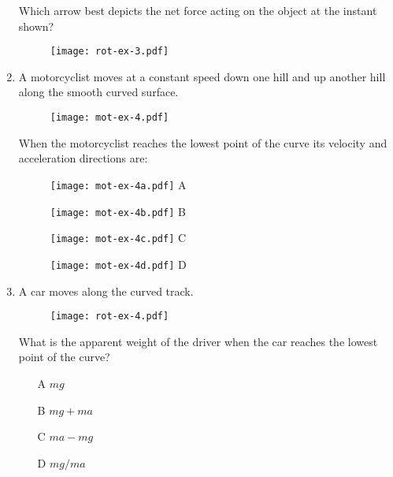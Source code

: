 \begin{enumerate}
Which arrow best depicts the net force acting on the object at the instant shown?

\begin{figure}[H]
\centering
\texttt{[image: rot-ex-3.pdf]}
\end{figure}


\item A motorcyclist moves at a constant speed down one hill and up another hill along the smooth curved surface. 

\begin{figure}[H]
\centering
\texttt{[image: mot-ex-4.pdf]}
\end{figure}

When the motorcyclist reaches the lowest point of the curve its velocity and acceleration directions are:



\begin{figure}[H]

\centering

\begin{minipage}{.1\textwidth}
  \centering
  \texttt{[image: mot-ex-4a.pdf]}
  A
\end{minipage}
\hspace{1cm}
\begin{minipage}{.1\textwidth}
  \centering
  \texttt{[image: mot-ex-4b.pdf]}
  B
\end{minipage}
\hspace{1cm}
\begin{minipage}{.1\textwidth}
  \centering
  \texttt{[image: mot-ex-4c.pdf]}
  C
\end{minipage}
\hspace{1cm}
\begin{minipage}{.1\textwidth}
  \centering
  \texttt{[image: mot-ex-4d.pdf]}
  D
\end{minipage}
\end{figure}

\item A car moves along the curved track. 

\begin{figure}[H]
\centering
\texttt{[image: rot-ex-4.pdf]}
\end{figure}

What is the apparent weight of the driver when the car reaches the lowest point of the curve?

\begin{itemize}
\item[A] $mg$
\item[B] $mg+ma$
\item[C] $ma-mg$ 
\item[D] $mg/ma$
\end{itemize}


\end{enumerate}
